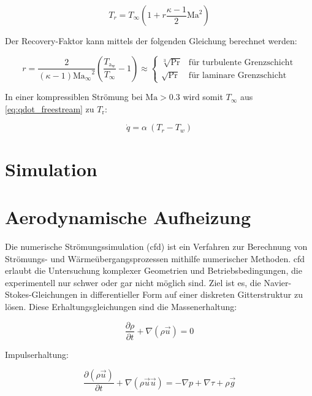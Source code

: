 \begin{equation}
  \label{eq:recovery_temperatur}
  T_r = T_{\infty} \left( 1 + r \frac{\kappa - 1}{2} \text{Ma}^2 \right)
\end{equation}

Der Recovery-Faktor kann mittels der folgenden Gleichung berechnet werden:

\begin{equation}
  \label{eq:recovery_faktor}
  r = \frac{2}{\left( \kappa - 1 \right) \mathrm{Ma_{\infty}}^2} \left( \frac{T_\mathrm{a_{w}}}{T_{\infty}} - 1 \right) \approx
  \begin{cases}
    \sqrt[3]{\text{Pr}} & \text{für turbulente Grenzschicht}\\
    \sqrt{\text{Pr}} & \text{für laminare Grenzschicht}
  \end{cases}
\end{equation}

In einer kompressiblen Strömung bei $\mathrm{Ma} > 0.3$ wird somit $T_{\infty}$ aus \ref{eq:qdot_freestream} zu $T_\text{r}$:

\begin{equation}
  \label{eq:qdot_recovery}
  \dot{q} = \alpha \ (T_r - T_w)
\end{equation}

\section{Simulation}
\section*{Aerodynamische Aufheizung}

Die numerische Strömungssimulation (\ac{cfd}) ist ein Verfahren zur Berechnung von Strömungs- und Wärmeübergangsprozessen
mithilfe numerischer Methoden. \ac{cfd} erlaubt die Untersuchung komplexer Geometrien und Betriebsbedingungen,
die experimentell nur schwer oder gar nicht möglich sind. Ziel ist es, die Navier-Stokes-Gleichungen in differentieller Form auf einer
diskreten Gitterstruktur zu lösen. Diese Erhaltungsgleichungen sind die Massenerhaltung:

\begin{equation}
  \label{eq:navier_massenerhaltung}
  \frac{\partial \rho}{\partial t} + \nabla \left( \rho \vec{u} \right) = 0
\end{equation}

Impulserhaltung:

\begin{equation}
  \label{eq:navier_impulserhaltung}
  \frac{\partial \left( \rho \vec{u} \right)}{\partial t} + \nabla \left( \rho \vec{u} \vec{u} \right) = -\nabla p + \nabla \tau + \rho \vec{g}
\end{equation}

